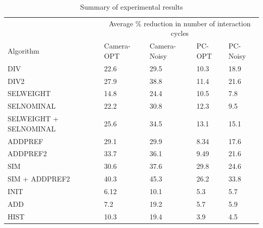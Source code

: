 \begin{table}
\caption{Summary of experimental results}
\centering
\renewcommand{\arraystretch}{1.2}
\label{tab:summary}

\begin{tabular}{|p{3.5cm}|p{1.8cm}|p{1.9cm}|p{1.9cm}|p{1.9cm}|}
 \cline{1-5}
  &\multicolumn{4}{c|}{Average \% reduction in number of interaction cycles}\\
 \cline{1-5}
Algorithm & Camera-OPT & Camera-Noisy & PC-OPT & PC-Noisy \\
 \cline{1-5}
DIV & 22.6  &29.5 &10.3 &18.9\\
\hline
DIV2 &27.9 &38.8 &11.4 &21.6\\
\hline
SELWEIGHT &14.8 &24.4 &10.5 &7.8\\
\hline
SELNOMINAL &22.2 &30.8 &12.3 &9.5\\
\hline
SELWEIGHT + SELNOMINAL &25.6 &34.5 &13.1 &15.1\\
\hline
ADDPREF &29.1 &29.9 &8.34 &17.6\\
\hline
ADDPREF2 &33.7 &36.1 &9.49 &21.6\\
\hline
SIM &30.6 &37.6 &29.8 &24.6\\
\hline
SIM + ADDPREF2 &40.3 &45.3 &26.2 &33.8\\
\hline
INIT &6.12 &10.1 &5.3 &5.7\\
\hline
ADD &7.2 &19.2 &5.7 &5.9\\
\hline
HIST &10.3 &19.4 &3.9 &4.5\\
\hline





\hline
\end{tabular}
\end{table}

